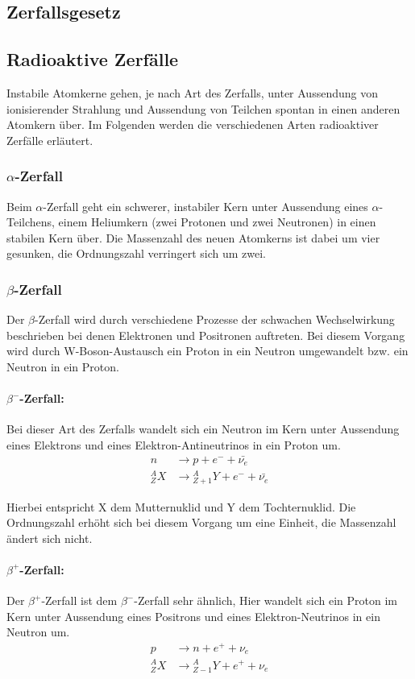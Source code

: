 \documentclass[12pt]{article}
\begin{document}
\subsection{Zerfallsgesetz}

\subsection{Radioaktive Zerfälle}
Instabile Atomkerne gehen, je nach Art des Zerfalls, unter Aussendung von ionisierender Strahlung und Aussendung von Teilchen spontan in einen anderen Atomkern über. Im Folgenden werden die verschiedenen Arten radioaktiver Zerfälle erläutert.
\subsubsection{$\alpha$-Zerfall}
Beim $\alpha$-Zerfall geht ein schwerer, instabiler Kern unter Aussendung eines $\alpha$-Teilchens, einem Heliumkern (zwei Protonen und zwei Neutronen) in einen stabilen Kern über. Die Massenzahl des neuen Atomkerns ist dabei um vier gesunken, die Ordnungszahl verringert sich um zwei.
\subsubsection{$\beta$-Zerfall}
Der $\beta$-Zerfall wird durch verschiedene Prozesse der schwachen Wechselwirkung beschrieben bei denen Elektronen  und Positronen auftreten. Bei diesem Vorgang wird durch W-Boson-Austausch ein Proton in ein Neutron umgewandelt bzw. ein Neutron in ein Proton.

\paragraph*{$\beta^-$-Zerfall:} 
Bei dieser Art des Zerfalls wandelt sich ein Neutron im Kern unter Aussendung eines Elektrons und eines Elektron-Antineutrinos in ein Proton um. 
\begin{align*}
n &\rightarrow p + e^- + \bar{\nu_e}\\
{}_Z^A X &\rightarrow {}_{Z+1}^A Y + e^- + \bar{\nu_e}
\end{align*}

Hierbei entspricht X dem Mutternuklid und Y dem Tochternuklid. Die Ordnungszahl erhöht sich bei diesem Vorgang um eine Einheit, die Massenzahl ändert sich nicht.

\paragraph*{$\beta^+$-Zerfall:}
Der $\beta^+$-Zerfall ist dem $\beta^-$-Zerfall sehr ähnlich, Hier wandelt sich ein Proton im Kern unter Aussendung eines Positrons und eines Elektron-Neutrinos in ein Neutron um.
\begin{align*}
p &\rightarrow n + e^+ + \nu_e\\
{}_Z^A X &\rightarrow {}_{Z-1}^A Y + e^+ + \nu_e
\end{align*}
\end{document}
